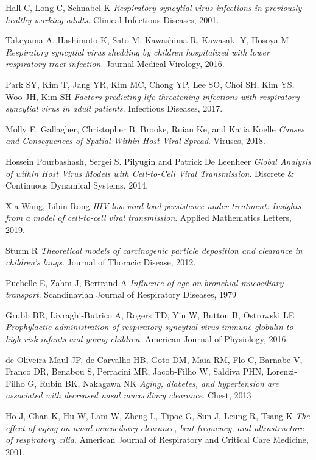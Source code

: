 \documentclass[a4paper]{article}
\begin{document}
\begin{thebibliography}{9}
Hall C, Long C, Schnabel K 
\textit{Respiratory syncytial virus infections in previously healthy working
adults}.
Clinical Infectious Diseases, 2001.

Takeyama A, Hashimoto K, Sato M, Kawashima R, Kawasaki Y, Hosoya M
\textit{Respiratory syncytial virus shedding by children hospitalized with lower respiratory tract infection}. 
Journal Medical Virology, 2016.

Park SY, Kim T, Jang YR, Kim MC, Chong YP, Lee SO, Choi SH, Kim YS, Woo JH, Kim SH
\textit{Factors predicting life-threatening infections with respiratory syncytial virus in adult patients}.
Infectious Diseases, 2017.

Molly E. Gallagher, Christopher B. Brooke, Ruian Ke, and Katia Koelle
\textit{Causes and Consequences of Spatial Within-Host Viral Spread}.
Viruses, 2018.

Hossein Pourbashash, Sergei S. Pilyugin and Patrick De Leenheer
\textit{Global Analysis of within Host Virus Models with Cell-to-Cell Viral Transmission}.
Discrete \& Continuous Dynamical Systems, 2014.

Xia Wang, Libin Rong
\textit{HIV low viral load persistence under treatment: Insights from a model of cell-to-cell viral transmission}.
Applied Mathematics Letters, 2019.

Sturm R
\textit{Theoretical models of carcinogenic particle deposition and clearance in children’s lungs}.
Journal of Thoracic Disease, 2012.

Puchelle E, Zahm J, Bertrand A
\textit{Influence of age on bronchial mucociliary transport}.
Scandinavian Journal of Respiratory Diseases, 1979

Grubb BR, Livraghi-Butrico A, Rogers TD, Yin W, Button B, Ostrowski LE
\textit{Prophylactic administration of respiratory syncytial virus immune globulin to high-risk infants and young children}. 
American Journal of Physiology, 2016.

de Oliveira-Maul JP, de Carvalho HB, Goto DM, Maia RM, Flo C, Barnabe V, Franco DR, Benabou S, Perracini MR, Jacob-Filho W, Saldiva PHN, Lorenzi-Filho G, Rubin BK, Nakagawa NK
\textit{Aging, diabetes, and hypertension are associated with decreased nasal mucociliary clearance}.
Chest, 2013

Ho J, Chan K, Hu W, Lam W, Zheng L, Tipoe G, Sun J, Leung R, Tsang K
\textit{The effect of aging on nasal mucociliary clearance, beat frequency, and ultrastructure of respiratory cilia}. 
American Journal of Respiratory and Critical Care Medicine, 2001.


\end{thebibliography}
\end{document}
